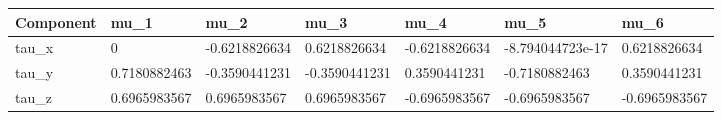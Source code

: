 \begin{tabular}{@{}lllllll@{}}
\toprule
Component & mu\_1 & mu\_2 & mu\_3 & mu\_4 & mu\_5 & mu\_6 \\
\midrule
tau\_x & 0 & -0.6218826634 & 0.6218826634 & -0.6218826634 & -8.794044723e-17 & 0.6218826634 \\
tau\_y & 0.7180882463 & -0.3590441231 & -0.3590441231 & 0.3590441231 & -0.7180882463 & 0.3590441231 \\
tau\_z & 0.6965983567 & 0.6965983567 & 0.6965983567 & -0.6965983567 & -0.6965983567 & -0.6965983567 \\
\bottomrule
\end{tabular}
